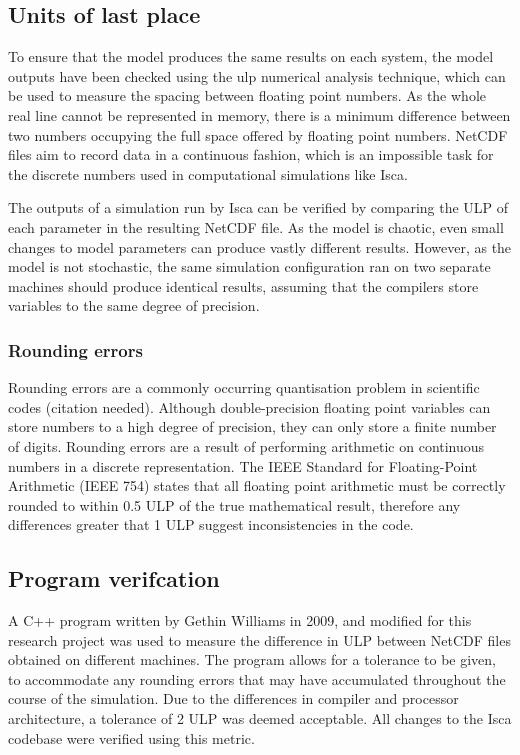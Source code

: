 \documentclass[a4paper,11pt]{report}
\begin{document}
\subsection{Units of last place}
To ensure that the model produces the same results on each system, the model outputs have been checked using the \gls{ulp} numerical analysis technique, which can be used to measure the spacing between floating point numbers. As the whole real line cannot be represented in memory, there is a minimum difference between two numbers occupying the full space offered by floating point numbers. NetCDF files aim to record data in a continuous fashion, which is an impossible task for the discrete numbers used in computational simulations like Isca.
\par
The outputs of a simulation run by Isca can be verified by comparing the ULP of each parameter in the resulting NetCDF file. As the model is chaotic, even small changes to model parameters can produce vastly different results. However, as the model is not stochastic, the same simulation configuration ran on two separate machines should produce identical results, assuming that the compilers store variables to the same degree of precision. 

\subsubsection{Rounding errors}
Rounding errors are a commonly occurring quantisation problem in scientific codes (citation needed). Although double-precision floating point variables can store numbers to a high degree of precision, they can only store a finite number of digits. Rounding errors are a result of performing arithmetic on continuous numbers in a discrete representation. The IEEE Standard for Floating-Point Arithmetic (IEEE 754) states that all floating point arithmetic must be correctly rounded to within 0.5 ULP of the true mathematical result, therefore any differences greater that 1 ULP suggest inconsistencies in the code. 

\subsection{Program verifcation}
A C++ program written by Gethin Williams in 2009, and modified for this research project was used to measure the difference in ULP between NetCDF files obtained on different machines. The program allows for a tolerance to be given, to accommodate any rounding errors that may have accumulated throughout the course of the simulation. Due to the differences in compiler and processor architecture, a tolerance of 2 ULP was deemed acceptable. All changes to the Isca codebase were verified using this metric.
\end{document}
